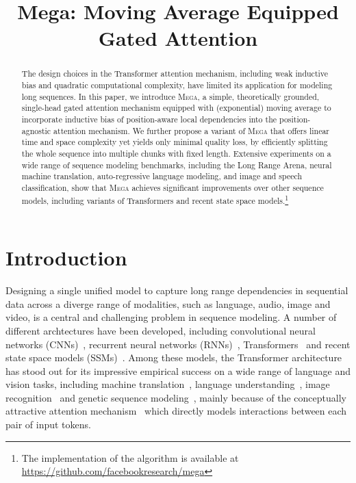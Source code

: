 \title{Mega: Moving Average Equipped Gated Attention}

\begin{abstract}
The design choices in the Transformer attention mechanism, including weak inductive bias and quadratic computational complexity, have limited its application for modeling long sequences. In this paper, we introduce \textsc{Mega}, a simple, theoretically grounded, single-head gated attention mechanism equipped with (exponential) moving average to incorporate inductive bias of position-aware local dependencies into the position-agnostic attention mechanism. We further propose a variant of \textsc{Mega} that offers linear time and space complexity yet yields only minimal quality loss, by efficiently splitting the whole sequence into multiple chunks with fixed length. Extensive experiments on a wide range of sequence modeling benchmarks, including the Long Range Arena, neural machine translation, auto-regressive language modeling, and image and speech classification, show that \textsc{Mega} achieves significant improvements over other sequence models, including variants of Transformers and recent state space models.\footnote{The implementation of the algorithm is available at \url{https://github.com/facebookresearch/mega}}
\end{abstract}

\section{Introduction}
Designing a single unified model to capture long range dependencies in sequential data across a diverge range of modalities, such as language, audio, image and video, is a central and challenging problem in sequence modeling. A number of different archtectures have been developed, including convolutional neural networks (CNNs)~\citep{kim-2014-convolutional,strubell-etal-2017-fast}, recurrent neural networks (RNNs)~\citep{goller1996learning,hochreiter1997long,cho2014properties}, Transformers~\citep{vaswani2017attention} and recent state space models (SSMs)~\citep{gu2022efficiently,mehta2022long}. Among these models, the Transformer architecture~\citep{vaswani2017attention} has stood out for its impressive empirical success on a wide range of language and vision tasks, including machine translation~\citep{vaswani2017attention,ott2018scaling}, language understanding~\citep{devlin2019bert,liu2019roberta}, image recognition~\citep{dosovitskiy2020image,touvron2021training} and genetic sequence modeling~\citep{madani2020progen,jumper2021highly}, mainly because of the conceptually attractive attention mechanism~\citep{bahdanau2015neural,luong2015effective,vaswani2017attention} which directly models interactions between each pair of input tokens. 

